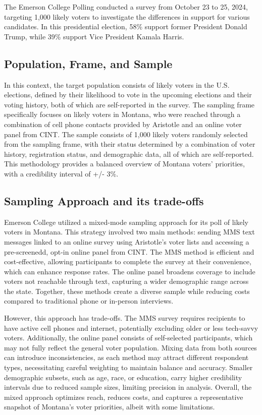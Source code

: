 \documentclass[
  letterpaper,
  DIV=11,
  numbers=noendperiod]{scrartcl}
\begin{document}
The Emerson College Polling conducted a survey from October 23 to 25,
2024, targeting 1,000 likely voters to investigate the differences in
support for various candidates. In this presidential election, 58\%
support former President Donald Trump, while 39\% support Vice President
Kamala Harris.

\hypertarget{population-frame-and-sample}{%
\subsection{Population, Frame, and
Sample}\label{population-frame-and-sample}}

In this context, the target population consists of likely voters in the
U.S. elections, defined by their likelihood to vote in the upcoming
elections and their voting history, both of which are self-reported in
the survey. The sampling frame specifically focuses on likely voters in
Montana, who were reached through a combination of cell phone contacts
provided by Aristotle and an online voter panel from CINT. The sample
consists of 1,000 likely voters randomly selected from the sampling
frame, with their status determined by a combination of voter history,
registration status, and demographic data, all of which are
self-reported. This methodology provides a balanced overview of Montana
voters' priorities, with a credibility interval of +/- 3\%.

\hypertarget{sampling-approach-and-its-trade-offs}{%
\subsection{Sampling Approach and its
trade-offs}\label{sampling-approach-and-its-trade-offs}}

Emerson College utilized a mixed-mode sampling approach for its poll of
likely voters in Montana. This strategy involved two main methods:
sending MMS text messages linked to an online survey using Aristotle's
voter lists and accessing a pre-screenedd, opt-in online panel from
CINT. The MMS method is efficient and cost-effective, allowing
participants to complete the survey at their convenience, which can
enhance response rates. The online panel broadens coverage to include
voters not reachable through text, capturing a wider demographic range
across the state. Together, these methods create a diverse sample while
reducing costs compared to traditional phone or in-person interviews.

However, this approach has trade-offs. The MMS survey requires
recipients to have active cell phones and internet, potentially
excluding older or less tech-savvy voters. Additionally, the online
panel consists of self-selected participants, which may not fully
reflect the general voter population. Mixing data from both sources can
introduce inconsistencies, as each method may attract different
respondent types, necessitating careful weighting to maintain balance
and accuracy. Smaller demographic subsets, such as age, race, or
education, carry higher credibility intervals due to reduced sample
sizes, limiting precision in analysis. Overall, the mixed approach
optimizes reach, reduces costs, and captures a representative snapshot
of Montana's voter priorities, albeit with some limitations.
\end{document}
